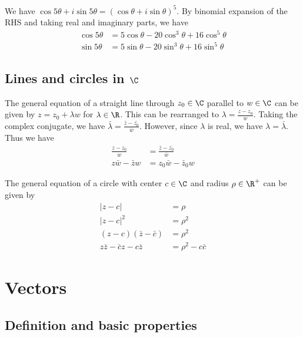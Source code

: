 \documentclass[a4paper]{article}
\begin{document}
\begin{eg}
  We have $\cos 5\theta + i\sin5\theta  = (\cos\theta + i\sin\theta)^5$. By binomial expansion of the RHS and taking real and imaginary parts, we have
  \begin{align*}
    \cos 5\theta &= 5\cos\theta - 20\cos^3\theta + 16\cos^5\theta\\
    \sin 5\theta &= 5\sin\theta - 20\sin^3\theta + 16\sin^5\theta
  \end{align*}
\end{eg}

\subsection{Lines and circles in \texorpdfstring{$\C$}{C}}
\begin{thm}
  The general equation of a straight line through $z_0\in \C$ parallel to $w\in \C$ can be given by $z = z_0 + \lambda w$ for $\lambda \in \R$. This can be rearranged to $\lambda = \frac{z - z_0}{w}$. Taking the complex conjugate, we have $\bar{\lambda} = \frac{\bar{z} - \bar{z_0}}{\bar{w}}$. However, since $\lambda$ is real, we have $\lambda = \bar{\lambda}$. Thus we have
  \begin{align*}
    \frac{z - z_0}{w} &= \frac{\bar{z} - \bar{z_0}}{\bar{w}}\\
    z\bar w - \bar z w &= z_0 \bar w - \bar z_0 w
  \end{align*}

  The general equation of a circle with center $c\in \C$ and radius $\rho \in \R^+$ can be given by
  \begin{align*}
    |z - c| &= \rho\\
    |z - c|^2 &= \rho^2\\
    (z - c)(\bar z - \bar c) &= \rho^2\\
    z\bar z - \bar c z - c\bar z &= \rho^2 - c\bar c
  \end{align*}
\end{thm}
\section{Vectors}
\subsection{Definition and basic properties}
\end{document}
